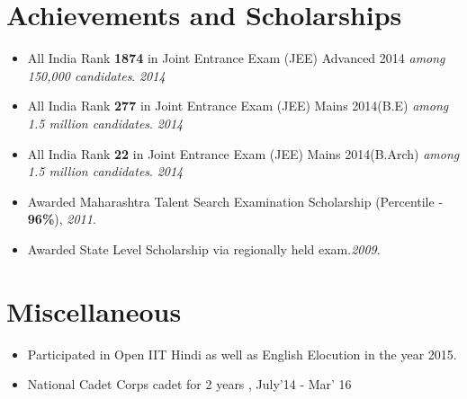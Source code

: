 \documentclass[11pt,a4paper]{moderncv}
\begin{document}
\vspace{-0.1cm}
\section*{Achievements and Scholarships}
\begin{itemize}
  \setlength\itemsep{0.5em}
\item All India Rank \textbf{1874} in Joint Entrance Exam (JEE) Advanced
2014 \textit{among 150,000 candidates}.             \hfill \textit{2014}

\item All India Rank \textbf{277} in Joint Entrance Exam (JEE) Mains 2014(B.E) \textit{among 1.5 million candidates}.              \hfill \textit{2014}

\item All India Rank \textbf{22} in Joint Entrance Exam (JEE) Mains 2014(B.Arch) \textit{among 1.5 million candidates}.              \hfill \textit{2014}

\item Awarded Maharashtra Talent Search Examination Scholarship (Percentile - \textbf{96\%}), \textit{2011}.

\item Awarded State Level Scholarship via regionally held exam.\textit{2009}.

\end{itemize}

\section*{Miscellaneous}
\begin{itemize}
  \item Participated in Open IIT Hindi as well as English Elocution in the year 2015.
  \item National Cadet Corps cadet for 2 years , July'14 - Mar' 16
\end{itemize}
\end{document}
